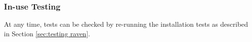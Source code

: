 \subsubsection{In-use Testing}

At any time, tests can be checked by re-running the installation tests as
described in Section \ref{sec:testing raven}.
